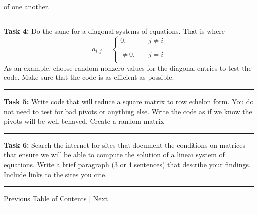 \documentclass[10pt,fleqn]{article}
\begin{document}
\begin{trivlist}
      of one another. 
\vskip0.1in\hrule\vskip0.1in \noindent
  \item[\bf Task 4:] Do the same for a diagonal systems of equations. That is
      where
         \[
           a_{i,j} = \left\lbrace
                       \begin{array}{rcl}
                         0,          & \ & j \neq i \\
                         \           & \ &       \\
                         \neq 0,     & \ & j = i \\
                       \end{array}
                     \right.
         \]
      As an example, choose random nonzero values for the diagonal entries to
      test the code. Make sure that the code is as efficient as possible.
\vskip0.1in\hrule\vskip0.1in \noindent
  \item[\bf Task 5:] Write code that will reduce a square matrix to row echelon
      form. You do not need to test for bad pivots or anything else. Write the
      code as if we know the pivots will be well behaved. Create a random matrix
\vskip0.1in\hrule\vskip0.1in \noindent
  \item[\bf Task 6:] Search the internet for sites that document the conditions
         on matrices that ensure we will be able to compute the solution of a
         linear system of equations. Write a brief paragraph (3 or 4 sentences)
         that describe your findings.  Include links to the sites you cite.
\end{trivlist}
\vskip0.1in\hrule\vskip0.1in \noindent
  \href{../../tasksheet_06/html/tasksheet_06.html}{Previous}
  \href{../../toc/md/tasksheet_toc.md}{Table of Contents} |
  \href{../../tasksheet_08/html/tasksheet_08.html}{Next}
\vskip0.1in\hrule\vskip0.1in \noindent
\end{document}
